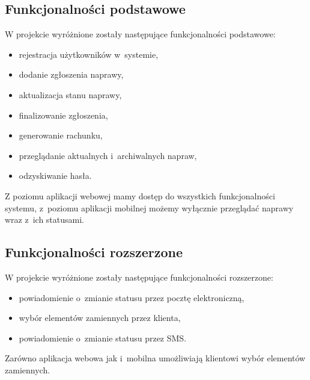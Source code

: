 \documentclass[a4paper,11pt]{article}
\begin{document}
\subsection{Funkcjonalności podstawowe}
W projekcie wyróżnione zostały następujące funkcjonalności podstawowe:
\begin{itemize}
	\item rejestracja użytkowników w~systemie,
	\item dodanie zgłoszenia naprawy,
	\item aktualizacja stanu naprawy,
	\item finalizowanie zgłoszenia,
	\item generowanie rachunku,
	\item przeglądanie aktualnych i~archiwalnych napraw,
	\item odzyskiwanie hasła.
\end{itemize}
Z poziomu aplikacji webowej mamy dostęp do wszystkich funkcjonalności systemu, z~poziomu aplikacji mobilnej możemy wyłącznie przeglądać naprawy wraz z~ich statusami.
\subsection{Funkcjonalności rozszerzone}
W projekcie wyróżnione zostały następujące funkcjonalności rozszerzone:
\begin{itemize}
	\item powiadomienie o~zmianie statusu przez pocztę elektroniczną,
	\item wybór elementów zamiennych przez klienta,
	\item powiadomienie o~zmianie statusu przez SMS.
\end{itemize}
Zarówno aplikacja webowa jak i~mobilna umożliwiają klientowi wybór elementów zamiennych.
\end{document}
